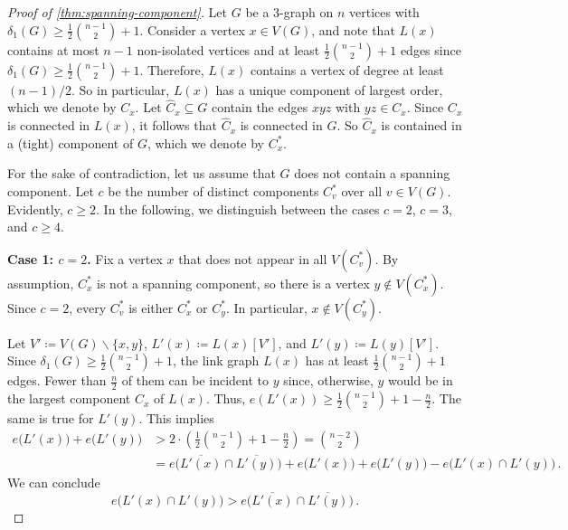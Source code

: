 \documentclass[12pt,reqno]{amsart}
\theoremstyle{plain}
\theoremstyle{definition}
\numberwithin{equation}{section}
\renewcommand{\subset}{\subseteq}
\begin{document}
	\begin{proof}[Proof of \cref{thm:spanning-component}]
		Let $G$ be a $3$-graph on $n$ vertices with $\delta_1(G) \geq \tfrac{1}{2}\binom{n-1}{2}+1$.
		Consider a vertex $x \in V(G)$, and note that $L(x)$ contains at most $n-1$ non-isolated vertices and at least $\tfrac{1}{2} \binom{n-1}{2} + 1$ edges since $\delta_1(G) \geq \tfrac{1}{2} \binom{n-1}{2} + 1$. Therefore, $L(x)$ contains a vertex of degree at least $(n-1)/2$. 
		So in particular, $L(x)$ has a unique component of largest order, which we denote by $C_x$.
		Let $\hat C_x \subset G$ contain the edges $xyz$ with $yz \in C_x$.
		Since $C_x$ is connected in $L(x)$, it follows that $\hat C_x$ is connected in $G$.
		So $\hat C_x$ is contained in a (tight) component of $G$, which we denote by $C_x^\ast$.
		
		For the sake of contradiction, let us assume that $G$ does not contain a spanning component.
		Let $c$ be the number of distinct components $C_v^\ast$ over all $v \in V(G)$.
		Evidently, $c \geq 2$.
		In the following, we distinguish between the cases $c=2$, $c=3$, and $c\geq 4$.
		
		\medskip
		\textbf{Case 1: $c=2$.}
		Fix a vertex $x$ that does not appear in all $V(C_v^\ast)$. By assumption, $C_x^\ast$ is not a spanning component, so there is a vertex $y\not\in V(C_x^\ast)$. Since $c=2$, every $C_v^\ast$ is either $C_x^\ast$ or $C_y^\ast$. In particular, $x\not\in V(C_y^\ast)$.
		
		Let $V'\coloneqq V(G)\backslash\{x,y\}$, $L'(x)\coloneq L(x)[V']$, and $L'(y)\coloneqq L(y)[V']$. 
		Since $\delta_1(G) \geq \tfrac{1}{2} \binom{n-1}{2} + 1$, the link graph $L(x)$ has at least $\frac{1}{2}\binom{n-1}{2}+1$ edges. Fewer than $\frac{n}{2}$ of them can be incident to $y$ since, otherwise, $y$ would be in the largest component $C_x$ of $L(x)$. Thus, $e(L'(x))\ge \frac{1}{2}\binom{n-1}{2}+1-\frac{n}{2}$. The same is true for $L'(y)$. This implies \begin{align*}
			e\big(L'(x)\big)+e\big(L'(y)\big)&>2\cdot\!\left(\frac{1}{2}\binom{n-1}{2}+1-\frac{n}{2}\right)
			=\binom{n-2}{2}\\&=e\big(\overline{L'(x)}\cap\overline{L'(y)}\big)+e\big(L'(x)\big)+e\big(L'(y)\big)-e\big(L'(x)\cap L'(y)\big)\,.
		\end{align*}
		We can conclude 
		\begin{equation}\label{eq: more in cap than the complement}
			e\big(L'(x)\cap L'(y)\big)>e\big(\overline{L'(x)}\cap\overline{L'(y)}\big)\,.
		\end{equation}
		

\end{proof}
\end{document}
